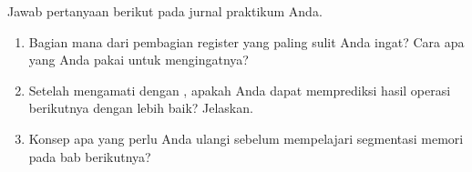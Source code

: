 \begin{refleksibox}
\vspace{1.1em}
Jawab pertanyaan berikut pada jurnal praktikum Anda.
\begin{enumerate}
    \item Bagian mana dari pembagian register yang paling sulit Anda
          ingat? Cara apa yang Anda pakai untuk mengingatnya?
    \item Setelah mengamati  dengan ,
          apakah Anda dapat memprediksi hasil operasi berikutnya
          dengan lebih baik? Jelaskan.
    \item Konsep apa yang perlu Anda ulangi sebelum mempelajari
          segmentasi memori pada bab berikutnya?
\end{enumerate}
\end{refleksibox}
